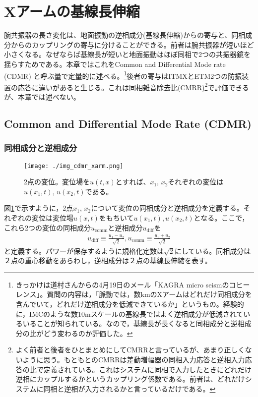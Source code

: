 
\section{Xアームの基線長伸縮}
腕共振器の長さ変化は、地面振動の逆相成分(基線長伸縮)からの寄与と、同相成分からのカップリングの寄与に分けることができる。前者は腕共振器が短いほど小さくなる。なぜならば基線長が短いと地面振動はほぼ同相で2つの共振器鏡を揺らすためである。本章ではこれをCommon and Differential Mode rate (CDMR) と呼ぶ量で定量的に述べる。\footnote[1]{きっかけは道村さんからの4月19日のメール「KAGRA micro seismのコヒーレンス」。質問の内容は，「脈動では，数kmのXアームはどれだけ同相成分を含んでいて，どれだけ逆相成分を低減できているか」というもの。経験的に，IMCのような数10mスケールの基線長ではよく逆相成分が低減されているいることが知られている。なので，基線長が長くなると同相成分と逆相成分の比がどう変わるのか評価した。}後者の寄与はITMXとETM2つの防振装置の応答に違いがあると生じる。これは同相雑音除去比(CMRR)\footnote[2]{よく前者と後者をひとまとめにしてCMRRと言っているが、あまり正しくないように思う。もともとのCMRRは差動増幅器の同相入力応答と逆相入力応答の比で定義されている。これはシステムに同相で入力したときにどれだけ逆相にカップルするかというカップリング係数である。前者は、どれだけシステムに同相と逆相が入力されるかと言っているだけである。}で評価できるが、本章では述べない。


\subsection{Common and Differential Mode Rate (CDMR)}
\subsubsection{同相成分と逆相成分}
\begin{figure}[H]
  \begin{center}
    \texttt{[image: ./img\_cdmr\_xarm.png]}
  \end{center}
  \caption{2点の変位。変位場を$u(t,x)$とすれば、$x_1,\,x_2$それぞれの変位は$u(x_1,t),\,u(x_2,t)$である。}\label{img:img_diffcomm}
\end{figure}

図\ref{img:img_diffcomm}で示すように，2点$x_1,\,x_2$について変位の同相成分と逆相成分を定義する。それぞれの変位は変位場$u(x,t)$をもちいて$u(x_1,t),u(x_2,t)$となる。ここで，これら2つの変位の同相成分$u_{\mathrm{comm}}$と逆相成分$u_\mathrm{diff}$を
\begin{eqnarray}\label{eq:eq22}
  u_{\mathrm{diff}} \equiv \frac{u_{1}-u_{2}}{\sqrt{2}},
  u_{\mathrm{comm}}  \equiv \frac{u_{1}+u_{2}}{\sqrt{2}}
\end{eqnarray}
と定義する。パワーが保存するように規格化定数は$\sqrt{2}$にしている。同相成分は２点の重心移動をあらわし，逆相成分は２点の基線長伸縮を表す。
